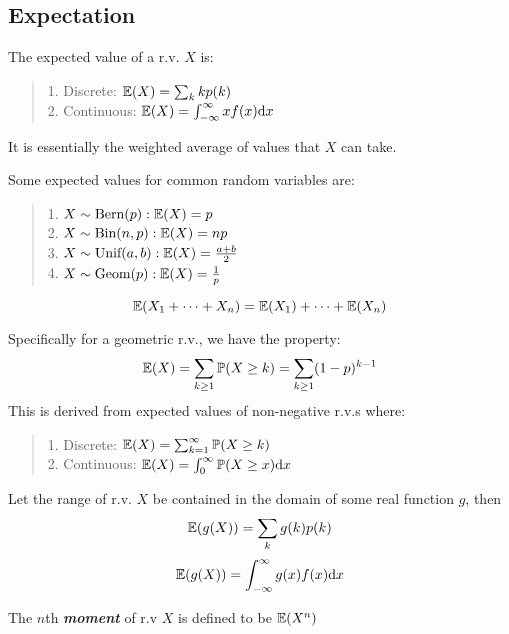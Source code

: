 \subsection{Expectation}
\begin{definition}
    The expected value of a r.v. $X$ is:
    \begin{quote}
        1. Discrete: $\mathbb{E}(X) = \sum_{k} kp(k)$ \\
        2. Continuous: $\mathbb{E}(X) = \int_{-\infty}^{\infty} xf(x)\dd x$
    \end{quote}
    It is essentially the weighted average of values that $X$ can take.
\end{definition}
Some expected values for common random variables are:
\begin{quote}
    1. $X \sim \text{Bern}(p): \mathbb{E}(X) = p$ \\
    2. $X \sim \text{Bin}(n, p): \mathbb{E}(X) = np$ \\
    3. $X \sim \text{Unif}(a, b): \mathbb{E}(X) = \frac{a+b}{2}$ \\
    4. $X \sim \text{Geom}(p): \mathbb{E}(X) = \frac{1}{p}$
\end{quote}
\begin{theorem}
    $$\mathbb{E}(X_1 + \dots + X_n) = \mathbb{E}(X_1) + \dots + \mathbb{E}(X_n)$$
\end{theorem}
Specifically for a geometric r.v., we have the property:
$$\mathbb{E}(X) = \sum_{k \ge 1} \mathbb{P}(X \ge k) = \sum_{k \ge 1} (1-p)^{k-1}$$
This is derived from expected values of non-negative r.v.s where:
\begin{quote}
    1. Discrete: $\mathbb{E}(X) = \sum_{k = 1}^{\infty} \mathbb{P}(X \ge k)$ \\
    2. Continuous: $\mathbb{E}(X) = \int_{0}^{\infty} \mathbb{P}(X \ge x) \dd x$
\end{quote}
\begin{theorem}
    Let the range of r.v. $X$ be contained in the domain of some real function $g$, then
    $$\mathbb{E}(g(X)) = \sum_{k} g(k)p(k)$$
    $$\mathbb{E}(g(X)) = \int_{-\infty}^{\infty} g(x)f(x) \dd x$$
\end{theorem}
\begin{definition}
    The $n$th \textbf{\textit{moment}} of r.v $X$ is defined to be $\mathbb{E}(X^n)$
\end{definition}

